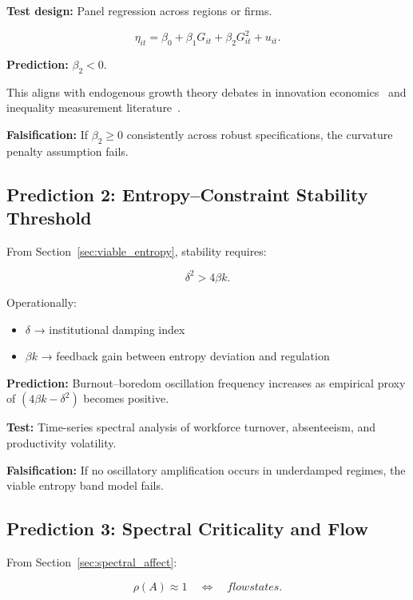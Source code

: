 \documentclass[12pt,a4paper]{article}
\theoremstyle{definition}
\begin{document}
\textbf{Test design:}
Panel regression across regions or firms.

\begin{equation}
  \eta_{it}
  =
  \beta_0
  +
  \beta_1 G_{it}
  +
  \beta_2 G_{it}^2
  +
  u_{it}.
\end{equation}

\textbf{Prediction:}
$\beta_2 < 0$.

This aligns with endogenous growth theory debates
in innovation economics~\citep{aghion2014}
and inequality measurement literature~\citep{atkinson2015,piketty2014}.

\textbf{Falsification:}
If $\beta_2 \ge 0$ consistently across robust specifications,
the curvature penalty assumption fails.

\subsection{Prediction 2: Entropy–Constraint Stability Threshold}

From Section~\ref{sec:viable_entropy},
stability requires:

\begin{equation}
  \delta^2 > 4\beta k.
\end{equation}

Operationally:

\begin{itemize}
  \item $\delta$ → institutional damping index
  \item $\beta k$ → feedback gain between entropy deviation and regulation
\end{itemize}

\textbf{Prediction:}
Burnout–boredom oscillation frequency increases
as empirical proxy of $(4\beta k - \delta^2)$ becomes positive.

\textbf{Test:}
Time-series spectral analysis of workforce turnover,
absenteeism, and productivity volatility.

\textbf{Falsification:}
If no oscillatory amplification occurs in underdamped regimes,
the viable entropy band model fails.

\subsection{Prediction 3: Spectral Criticality and Flow}

From Section~\ref{sec:spectral_affect}:

\begin{equation}
  \rho(A) \approx 1
  \quad \Longleftrightarrow \quad
  flow states.
\end{equation}
\end{document}
